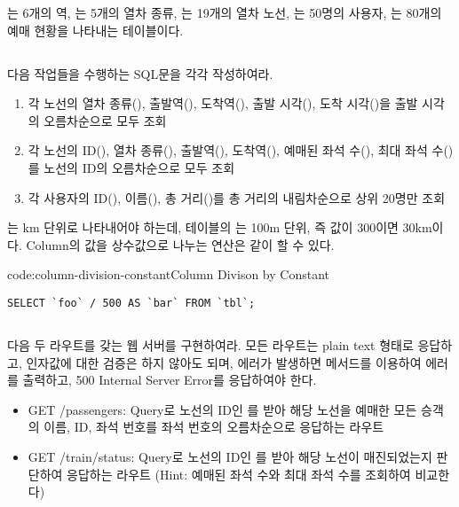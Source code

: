 는 6개의 역, 는 5개의 열차 종류, 는 19개의 열차 노선, 는 50명의 사용자, 는 80개의 예매 현황을 나타내는 테이블이다.

\subsection*{}

다음 작업들을 수행하는 SQL문을 각각 작성하여라.

\begin{enumerate}
    \item 각 노선의 열차 종류(), 출발역(), 도착역(), 출발 시각(), 도착 시각()을 출발 시각의 오름차순으로 모두 조회
    \item 각 노선의 ID(), 열차 종류(), 출발역(), 도착역(), 예매된 좌석 수(), 최대 좌석 수()를 노선의 ID의 오름차순으로 모두 조회
    \item 각 사용자의 ID(), 이름(), 총 거리()를 총 거리의 내림차순으로 상위 20명만 조회
\end{enumerate}

는 km 단위로 나타내어야 하는데,  테이블의 는 100m 단위, 즉 값이 300이면 30km이다. Column의 값을 상수값으로 나누는 연산은 \와 같이 할 수 있다.

\begin{codeenv}{code:column-division-constant}{Column Divison by Constant}\begin{verbatim}
SELECT `foo` / 500 AS `bar` FROM `tbl`;
\end{verbatim}
\end{codeenv}

\subsection*{}

다음 두 라우트를 갖는 웹 서버를 구현하여라. 모든 라우트는 plain text 형태로 응답하고, 인자값에 대한 검증은 하지 않아도 되며, 에러가 발생하면  메서드를 이용하여 에러를 출력하고, 500 Internal Server Error를 응답하여야 한다.

\begin{itemize}
    \item GET /passengers: Query로 노선의 ID인 를 받아 해당 노선을 예매한 모든 승객의 이름, ID, 좌석 번호를 좌석 번호의 오름차순으로 응답하는 라우트
    \item GET /train/status: Query로 노선의 ID인 를 받아 해당 노선이 매진되었는지 판단하여 응답하는 라우트 (Hint: 예매된 좌석 수와 최대 좌석 수를 조회하여 비교한다)
\end{itemize}
